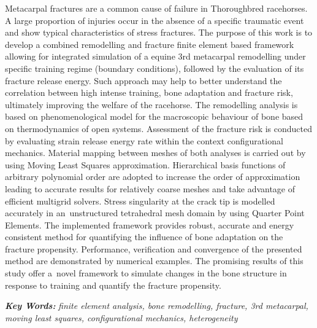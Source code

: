 \documentclass[11pt]{acmeArticle}
\numberwithin{equation}{section}
\begin{document}
{\small 
	Metacarpal fractures are a common cause of failure in Thoroughbred racehorses. A large proportion of injuries occur in the absence of a specific traumatic event and show typical characteristics of stress fractures. The purpose of this work is to develop a combined remodelling and fracture finite element based framework allowing for integrated simulation of a equine 3rd metacarpal remodelling under specific training regime (boundary conditions), followed by the evaluation of its fracture release energy. Such approach may help to better understand the correlation between high intense training, bone adaptation and fracture risk, ultimately improving the welfare of the racehorse. The remodelling analysis is based on phenomenological model for the macroscopic behaviour of bone based on thermodynamics of open systems. Assessment of the fracture risk is conducted by evaluating strain release energy rate within the context configurational mechanics. Material mapping between meshes of both analyses is carried out by using Moving Least Squares approximation. Hierarchical basis functions of arbitrary polynomial order are adopted to increase the order of approximation leading to accurate results for relatively coarse meshes and take advantage of efficient multigrid solvers. Stress singularity at the crack tip is modelled accurately in an~unstructured tetrahedral mesh domain by using Quarter Point Elements. The implemented framework provides robust, accurate and energy consistent method for quantifying the influence of bone adaptation on the fracture propensity. Performance, verification and convergence of the presented method are demonstrated by numerical examples. The promising results of this study offer a~novel framework to simulate changes in the bone structure in response to training and quantify the fracture propensity. 
	
\textbf{\textit{Key Words:}} {\it finite element analysis, bone remodelling, fracture, 3rd metacarpal, moving least squares, configurational mechanics, heterogeneity}}
%
\\
\newpage
\end{document}
